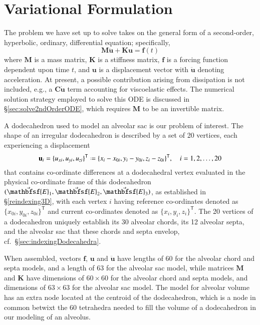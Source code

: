 \setcounter{section}{0}
\part{Variational Formulation}
\label{partVariational}

The problem we have set up to solve takes on the general form of a second-order, hyperbolic, ordinary, differential equation; specifically,
\begin{equation}
	\mathbf{M} \ddot{\mathbf{u}} + \mathbf{K} \mathbf{u} = \mathbf{f}(t)
\end{equation}
where $\mathbf{M}$ is a mass matrix, $\mathbf{K}$ is a stiffness matrix, $\mathbf{f}$ is a forcing function dependent upon time $t$, and $\mathbf{u}$ is a displacement vector with $\ddot{\mathbf{u}}$ denoting acceleration.  At present, a possible contribution arising from dissipation is not included, e.g., a $\mathbf{C} \dot{\mathbf{u}}$ term accounting for visco\-elastic effects.  The numerical solution strategy employed to solve this ODE is discussed in \S\ref{sec:solve2ndOrderODE}, which requires $\mathbf{M}$ to be an invertible matrix.

A dodecahedron used to model an alveolar sac is our problem of interest.  The shape of an irregular dodecahedron is described by a set of 20 vertices, each experiencing a displacement
\begin{equation}
	\mathbf{u}_i = \{ u_{xi} , u_{yi} , u_{zi} \}^{\mathsf{T}} \defeq
    \{ x_i - x_{0i} , y_i - y_{0i} , z_i - z_{0i} \}^{\mathsf{T}} ,
    \quad i = 1, 2, \ldots , 20
\end{equation}
that contains co-ordinate differences at a dodecahedral vertex evaluated in the physical co-ordinate frame of this dodecahedron $( \vec{\mathbfsf{E}}_1 , \vec{\mathbfsf{E}}_2 , \vec{\mathbfsf{E}}_3 )$, as established in \S\ref{reindexing3D}, with each vertex $i$ having reference co-ordinates denoted as $\{ x_{0i} , y_{0i} , z_{0i} \}^{\mathsf{T}}$ and current co-ordinates denoted as $\{ x_i , y_i , z_i \}^{\mathsf{T}}$.  The 20 vertices of a dodecahedron uniquely establish its 30 alveolar chords, its 12 alveolar septa, and the alveolar sac that these chords and septa envelop, cf.\ \S\ref{sec:indexingDodecahedra}.

When assembled, vectors $\mathbf{f}$, $\mathbf{u}$ and $\ddot{\mathbf{u}}$ have lengths of 60 for the alveolar chord and septa models, and a length of 63 for the alveolar sac model, while matrices $\mathbf{M}$ and $\mathbf{K}$ have dimensions of $60 \! \times \! 60$ for the alveolar chord and septa models, and dimensions of $63 \! \times \! 63$ for the alveolar sac model.  The model for alveolar volume has an extra node located at the centroid of the dodecahedron, which is a node in common betwixt the 60 tetrahedra needed to fill the volume of a dodecahedron in our modeling of an alveolus. 

